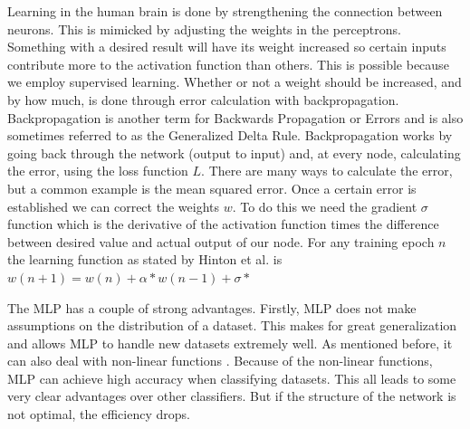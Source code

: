Learning in the human brain is done by strengthening the connection between neurons. This is mimicked by adjusting the weights in the perceptrons. Something with a desired result will have its weight increased so certain inputs contribute more to the activation function than others. This is possible because we employ supervised learning. Whether or not a weight should be increased, and by how much, is done through error calculation with backpropagation. Backpropagation is another term for Backwards Propagation or Errors \cite{rumelhart1985learning} and is also sometimes referred to as the Generalized Delta Rule. Backpropagation works by going back through the network (output to input) and, at every node, calculating the error, using the loss function $L$. There are many ways to calculate the error, but a common example is the mean squared error. Once a certain error is established we can correct the weights $w$. To do this we need the gradient $\sigma$ function which is the derivative of the activation function times the difference between desired value and actual output of our node. For any training epoch $n$ the learning function as stated by Hinton et al. is $w(n+1)=w(n) + \alpha * w(n-1) + \sigma * $

The MLP has a couple of strong advantages. Firstly, MLP does not make assumptions on the distribution of a dataset. This makes for great generalization and allows MLP to handle new datasets extremely well. As mentioned before, it can also deal with non-linear functions \cite{gardner1998artificial}. Because of the non-linear functions, MLP can achieve high accuracy when classifying datasets. This all leads to some very clear advantages over other classifiers. But if the structure of the network is not optimal, the efficiency drops.
